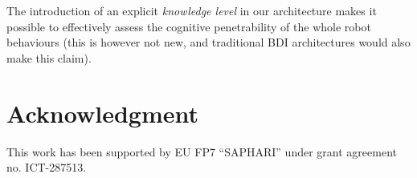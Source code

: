 \documentclass[letterpaper, 10 pt, conference]{ieeeconf}  %
\begin{document}
The introduction of an explicit \emph{knowledge level} in our architecture
makes it possible to effectively assess the cognitive penetrability of the
whole robot behaviours (this is however not new, and traditional BDI
architectures would also make this claim).

\section*{Acknowledgment}

This work has been supported by EU FP7 ``SAPHARI'' under grant agreement no. ICT-287513.



\end{document}
